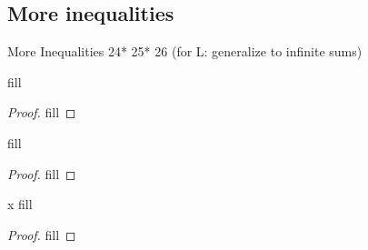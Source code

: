 \subsection{More inequalities}

More Inequalities
24*
25*
26 (for L: generalize to infinite sums)


\begin{exercise}{24}
fill
\end{exercise}
\begin{proof}
fill
\end{proof} 

\begin{exercise}{25}
fill
\end{exercise}
\begin{proof}
fill
\end{proof} 

\begin{exercise}{x}
fill
\end{exercise}
\begin{proof}
fill
\end{proof} 

